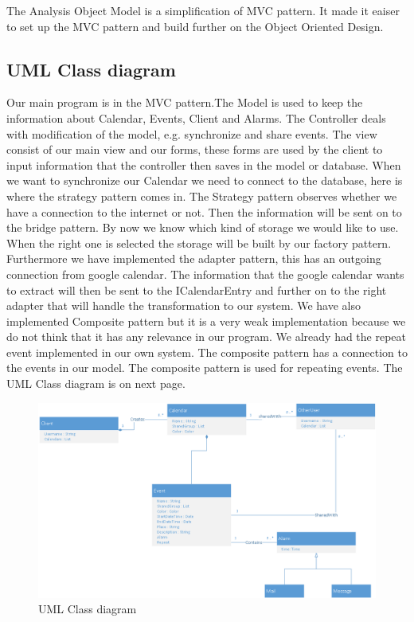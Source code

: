 The Analysis Object Model is a simplification of MVC pattern. It made it eaiser to set up the MVC pattern and build further on the Object Oriented Design. 

\subsection{UML Class diagram}
Our main program is in the MVC pattern.The Model is used to keep the information about Calendar, Events, Client and Alarms. The Controller deals with modification of the model, e.g. synchronize and share events. The view consist of our main view and our forms, these forms are used by the client to input information that the controller then saves in the model or database.
When we want to synchronize our Calendar we need to connect to the database, here is where the strategy pattern comes in. The Strategy pattern observes whether we have a connection to the internet or not. Then the information will be sent on to the bridge pattern. By now we know which kind of storage we would like to use. When the right one is selected the storage will be built by our factory pattern. 
Furthermore we have implemented the adapter pattern, this has an outgoing connection from google calendar. The information that the google calendar wants to extract will then be sent to the ICalendarEntry and further on to the right adapter that will handle the transformation to our system. 
We have also implemented Composite pattern but it is a very weak implementation because we do not think that it has any relevance in our program. We already had the repeat event implemented in our own system. The composite pattern has a connection to the events in our model. The composite pattern is used for repeating events.
\newline
The UML Class diagram is on next page.

\begin{figure}
\centering
\includegraphics[width=210mm]{class.png}
\caption{UML Class diagram \label{overflow}}
\label{figur:class}
\end{figure}
